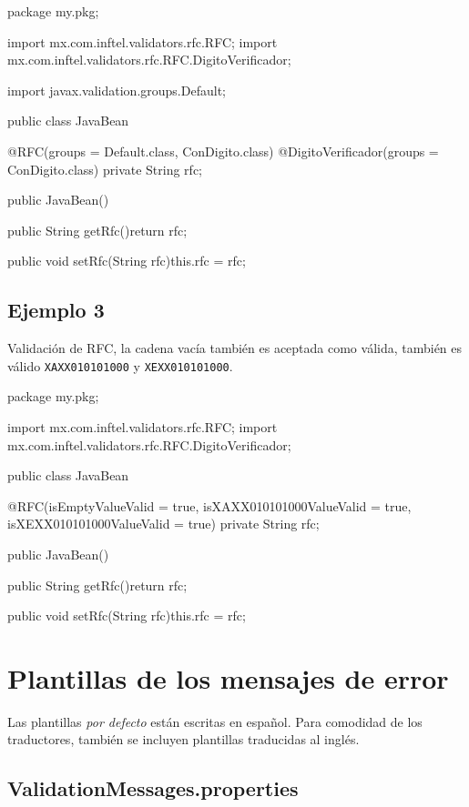 \documentclass[12pt,letterpaper]{article}
\begin{document}
\begin{listing}{1}
package my.pkg;

import mx.com.inftel.validators.rfc.RFC;
import mx.com.inftel.validators.rfc.RFC.DigitoVerificador;

import javax.validation.groups.Default;

public class JavaBean{

    @RFC(groups = {Default.class, ConDigito.class})
    @DigitoVerificador(groups = {ConDigito.class})
    private String rfc;

    public JavaBean(){}

    public String getRfc(){return rfc;}

    public void setRfc(String rfc){this.rfc = rfc;}
}
\end{listing}

\subsection{Ejemplo 3}

Validación de RFC, la cadena vacía también es aceptada como válida, también es válido
\texttt{\textquotedbl{}XAXX010101000\textquotedbl} y \texttt{\textquotedbl{}XEXX010101000\textquotedbl}.

\begin{listing}{1}
package my.pkg;

import mx.com.inftel.validators.rfc.RFC;
import mx.com.inftel.validators.rfc.RFC.DigitoVerificador;

public class JavaBean{

    @RFC(isEmptyValueValid = true,
         isXAXX010101000ValueValid = true,
         isXEXX010101000ValueValid = true)
    private String rfc;

    public JavaBean(){}

    public String getRfc(){return rfc;}

    public void setRfc(String rfc){this.rfc = rfc;}
}
\end{listing}

\section{Plantillas de los mensajes de error}

Las plantillas \emph{por defecto} están escritas en español. Para comodidad de los traductores,
también se incluyen plantillas traducidas al inglés.

\subsection{ValidationMessages.properties}
\end{document}
